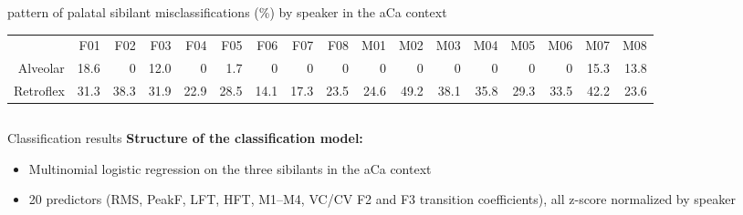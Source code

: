 \documentclass[serif, mathserif, final, xcolor=table]{beamer}
\newcommand{\colsep}{\hspace{1.5em}}
\begin{document}
\begin{frame}[t]{}
\begin{columns}[t]
\begin{column}{0.72\linewidth}
\begin{columns}[t]
      \end{columns}
		\vspace{-1cm}
      \begin{block}{pattern of palatal sibilant misclassifications (\%) by speaker in the \MakeLowercase{a}C\MakeLowercase{a} context}
        \large
        \begin{tabular}{rrrrrrrrrrrrrrrrr}
                    & \colsep F01 & \colsep F02 & \colsep F03 & \colsep F04 & \colsep F05 & \colsep F06 & \colsep F07 & \colsep F08 & \colsep M01 & \colsep M02 & \colsep M03 & \colsep M04 & \colsep M05 & \colsep M06 & \colsep M07 & \colsep M08 \\
          Alveolar  &        18.6 &        0    &        12.0 &        0    &         1.7 &        0    &        0    &        0    &        0    &        0    &        0    &        0    &        0    &        0    &        15.3 &        13.8 \\
          Retroflex &        31.3 &        38.3 &        31.9 &        22.9 &        28.5 &        14.1 &        17.3 &        23.5 &        24.6 &        49.2 &        38.1 &        35.8 &        29.3 &        33.5 &        42.2 &        23.6 \\
        \end{tabular}
      \end{block}
      \vspace{-2.5cm}
      \begin{columns}[t]

        \begin{column}{0.485\linewidth}

          \begin{block}{Classification results}
            \hspace{-0.9cm}\textbf{Structure of the classification model:}
            \begin{itemize}
              \item Multinomial logistic regression on the three sibilants in the aCa context
              \item 20 predictors (RMS, PeakF, LFT, HFT, M1--M4, VC/CV F2 and F3 transition coefficients), all z-score normalized by speaker
            \end{itemize}
            

\end{block}
\end{column}
\end{columns}
\end{column}
\end{columns}
\end{frame}
\end{document}
